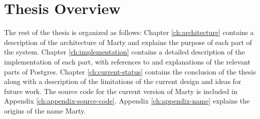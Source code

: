 \section{Thesis Overview}
The rest of the thesis is organized as follows: Chapter \ref{ch:architecture} contains a description of the architecture of Marty and explains the purpose of each part of the system.
Chapter \ref{ch:implementation} contains a detailed description of the implementation of each part, with references to and explanations of the relevant parts of Postgres.
Chapter \ref{ch:current-status} contains the conclusion of the thesis along with a description of the limitations of the current design and ideas for future work.
The source code for the current version of Marty is included in Appendix \ref{ch:appendix-source-code}.
Appendix \ref{ch:appendix-name} explains the origins of the name Marty.
